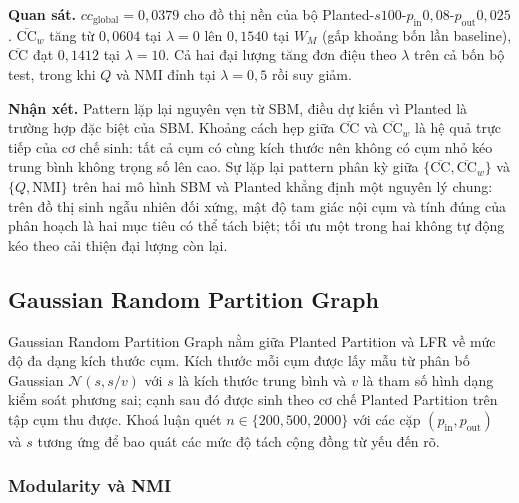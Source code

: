 \textbf{Quan sát.} $cc_{\mathrm{global}} = 0{,}0379$ cho đồ thị nền của bộ Planted-$s100$-$p_{\mathrm{in}}0{,}08$-$p_{\mathrm{out}}0{,}025$. $\overline{\mathrm{CC}}_w$ tăng từ $0{,}0604$ tại $\lambda = 0$ lên $0{,}1540$ tại $W_M$ (gấp khoảng bốn lần baseline), $\overline{\mathrm{CC}}$ đạt $0{,}1412$ tại $\lambda = 10$. Cả hai đại lượng tăng đơn điệu theo $\lambda$ trên cả bốn bộ test, trong khi $Q$ và NMI đỉnh tại $\lambda = 0{,}5$ rồi suy giảm.

\textbf{Nhận xét.} Pattern lặp lại nguyên vẹn từ SBM, điều dự kiến vì Planted là trường hợp đặc biệt của SBM. Khoảng cách hẹp giữa $\overline{\mathrm{CC}}$ và $\overline{\mathrm{CC}}_w$ là hệ quả trực tiếp của cơ chế sinh: tất cả cụm có cùng kích thước nên không có cụm nhỏ kéo trung bình không trọng số lên cao. Sự lặp lại pattern phân kỳ giữa $\{\overline{\mathrm{CC}}, \overline{\mathrm{CC}}_w\}$ và $\{Q, \mathrm{NMI}\}$ trên hai mô hình SBM và Planted khẳng định một nguyên lý chung: trên đồ thị sinh ngẫu nhiên đối xứng, mật độ tam giác nội cụm và tính đúng của phân hoạch là hai mục tiêu có thể tách biệt; tối ưu một trong hai không tự động kéo theo cải thiện đại lượng còn lại.

\subsection{Gaussian Random Partition Graph}
\label{subsec:results-grpg}

Gaussian Random Partition Graph nằm giữa Planted Partition và LFR về mức độ đa dạng kích thước cụm. Kích thước mỗi cụm được lấy mẫu từ phân bố Gaussian $\mathcal{N}(s, s/v)$ với $s$ là kích thước trung bình và $v$ là tham số hình dạng kiểm soát phương sai; cạnh sau đó được sinh theo cơ chế Planted Partition trên tập cụm thu được. Khoá luận quét $n \in \{200, 500, 2000\}$ với các cặp $(p_{\mathrm{in}}, p_{\mathrm{out}})$ và $s$ tương ứng để bao quát các mức độ tách cộng đồng từ yếu đến rõ.

\subsubsection*{Modularity và NMI}

